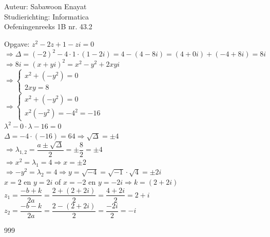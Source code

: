 \documentclass[a4paper]{article}
\begin{document}
  
\noindent \large Auteur: Sabawoon Enayat \\
\noindent \large Studierichting: Informatica\\
\noindent \large Oefeningenreeks 1B nr. 43.2\\

\medskip

\normalsize

Opgave: $z^2 - 2z + 1 - zi = 0$\\

$\Rightarrow \Delta = (-2)^2 - 4 \cdot 1 \cdot (1 - 2i) = 4 - (4 - 8i) = (4 + 0i) + (-4 + 8i) = 8i$\\

$\Rightarrow 8i = (x + yi)^2 = x^2 - y^2 + 2xyi$\\

$\Rightarrow \left \{
	\begin{array}{l}
		x^2 + (- y^2) = 0 \\
		2xy = 8
	\end{array}
\right.$\\

$\Rightarrow \left \{
	\begin{array}{l}
		x^2 + (- y^2) = 0 \\
		x^2 (- y^2) = - 4^2 = - 16
	\end{array}
\right.$\\

$\lambda^2 - 0 \cdot \lambda - 16 = 0$\\

$\Delta = - 4 \cdot (- 16) = 64 \Rightarrow \sqrt{\Delta} = \pm 4$\\

$\Rightarrow \lambda_{1,2} = \dfrac{a \pm \sqrt{\Delta}}{2} = \pm \dfrac{8}{2} = \pm 4$\\

$\Rightarrow x^2 = \lambda_{1} = 4 \Rightarrow x = \pm 2$\\

$\Rightarrow -y^2 = \lambda_{2} = 4 \Rightarrow y = \sqrt{- 4} = \sqrt{- 1} \cdot \sqrt{4} = \pm 2i$\\

$x = 2$ en $y = 2i$ of $x = -2$ en $y = -2i \Rightarrow k = (2 + 2i)$\\

$z_1 = \dfrac{-b + k}{2a} = \dfrac{2 + (2 + 2i)}{2} = \dfrac{4 + 2i}{2} = 2 + i$\\

$z_2 = \dfrac{-b - k}{2a} = \dfrac{2 - (2 + 2i)}{2} = \dfrac{- 2i}{2} = - i$\\

\begin{thebibliography}{999}
\end{thebibliography}
\end{document}
